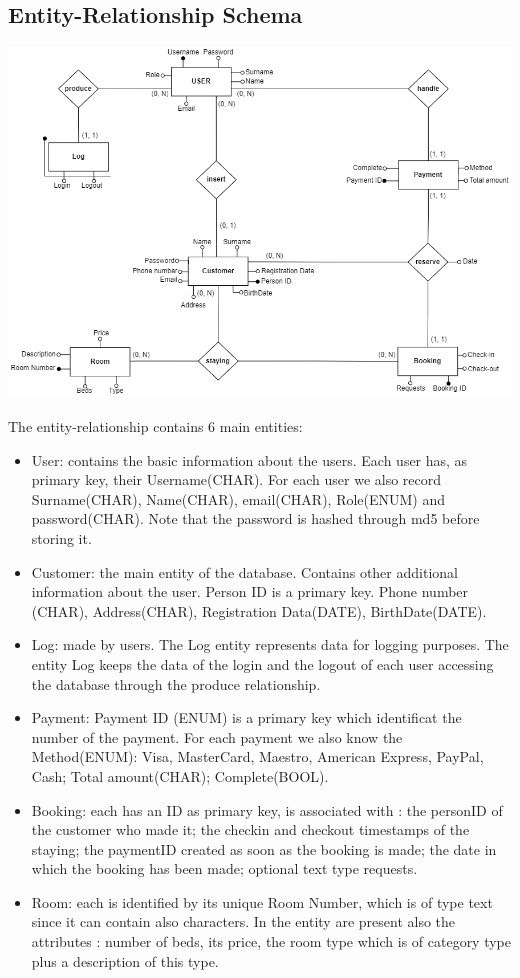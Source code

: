 \subsection{Entity-Relationship Schema}

\includegraphics[width=\columnwidth]{images/hotel_ERschema.png}

\noindent The entity-relationship contains 6 main entities:
\begin{itemize}
    \item User: contains the basic information about the users. Each user has, as primary key, their Username(CHAR). For each user we also record Surname(CHAR), Name(CHAR), email(CHAR), Role(ENUM) and password(CHAR). Note that the password is hashed through md5 before storing it.
    \item Customer: the main entity of the database. Contains other additional information about the user. Person ID is a primary key. Phone number (CHAR), Address(CHAR), Registration Data(DATE), BirthDate(DATE).
    \item Log:  made by users. The Log entity represents data for logging purposes. The entity Log keeps the data of the login and the logout of each user accessing the database through the produce relationship.
    \item Payment: Payment ID (ENUM) is a primary key which identificat the number of the payment. For each payment we also know the Method(ENUM): Visa, MasterCard, Maestro, American Express, PayPal, Cash; Total amount(CHAR); Complete(BOOL).
    \item Booking: each has an ID as primary key, is associated with : the personID of the customer who made it; the checkin and checkout timestamps of the staying; the paymentID created as soon as the booking is made; the date in which the booking has been made; optional text type requests.
    \item Room: each is identified by its unique Room Number, which is of type text since it can contain also characters. 
    In the entity are present also the attributes : number of beds, its price, the room type which is of category type plus a description of this type. 
\end{itemize}